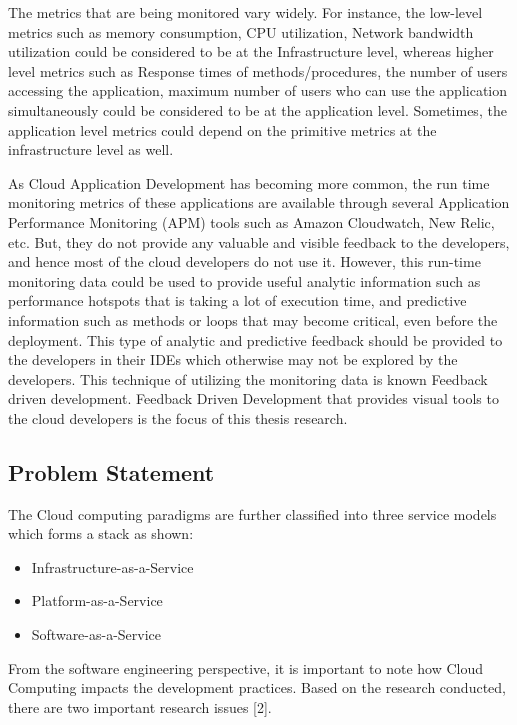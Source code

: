\documentclass[article,type=msc,colorback,accentcolor=tud7b]{tudthesis}
\begin{document}
	\par The metrics that are being monitored vary widely. For instance, the low-level metrics such as memory consumption, CPU utilization, Network bandwidth utilization could be considered to be at the Infrastructure level, whereas higher level metrics such as Response times of methods/procedures, the number of users accessing the application, maximum number of users who can use the application simultaneously could be considered to be at the application level. Sometimes, the application level metrics could depend on the primitive metrics at the infrastructure level as well.
	
	\par As Cloud Application Development has becoming more common, the run time monitoring metrics of these applications are available through several Application Performance Monitoring (APM) tools such as Amazon Cloudwatch, New Relic, etc. But, they do not provide any valuable and visible feedback to the developers, and hence most of the cloud developers do not use it. However, this run-time monitoring data could be used to provide useful analytic information such as performance hotspots that is taking a lot of execution time, and predictive information such as methods or loops that may become critical, even before the deployment. This type of analytic and predictive feedback should be provided to the developers in their IDEs which otherwise may not be explored by the developers. This technique of utilizing the monitoring data is known Feedback driven development. Feedback Driven Development that provides visual tools to the cloud developers is the focus of this thesis research.	
	
	\subsection{Problem Statement}	
	
The Cloud computing paradigms are further classified into three service models which forms a stack as shown: 
\begin{itemize}
	
	\item Infrastructure-as-a-Service
	
	\item Platform-as-a-Service
	
	\item Software-as-a-Service  
\end{itemize}
	
From the software engineering perspective, it is important to note how Cloud Computing impacts the development practices. Based on the research conducted, there are two important research issues [2]. 
\end{document}
